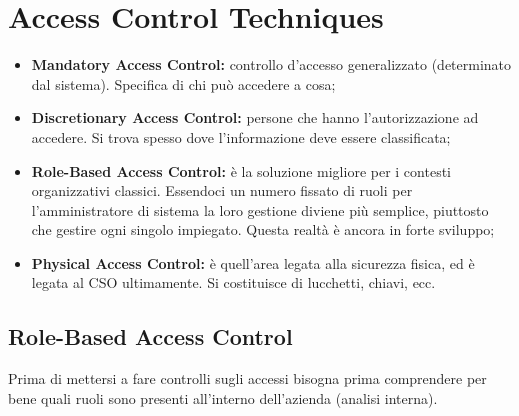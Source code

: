 \chapter{Access Control Techniques}
\label{AccessControlTechniques}
\begin{itemize}
 \item \textbf{Mandatory Access Control:} controllo d'accesso generalizzato 
 (determinato dal sistema). Specifica di chi può accedere a cosa;
 \item \textbf{Discretionary Access Control:} persone che hanno l'autorizzazione ad
 accedere. Si trova spesso dove l'informazione deve essere classificata;
 \item \textbf{Role-Based Access Control:} è la soluzione migliore per i contesti
 organizzativi classici. Essendoci un numero fissato di ruoli per
 l'amministratore di sistema la loro gestione diviene più semplice, piuttosto
che gestire ogni singolo impiegato. Questa realtà è ancora in forte sviluppo;
 \item \textbf{Physical Access Control:} è quell'area legata alla sicurezza fisica, ed è
 legata al CSO ultimamente. Si costituisce di lucchetti, chiavi, ecc.
\end{itemize}


\section{Role-Based Access Control}

Prima di mettersi a fare controlli sugli accessi bisogna prima comprendere per
bene quali ruoli sono presenti all'interno dell'azienda (analisi interna).

\begin{table}[H]
\centering
{}
\caption{Un esempio di un \textit{Role-Based Access Control}}
\end{table}



